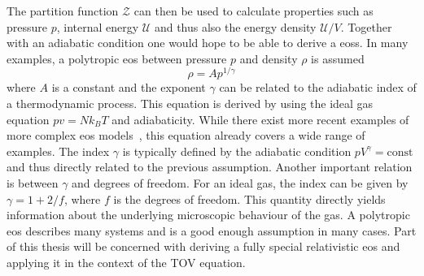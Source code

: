The partition function $\mathcal{Z}$ can then be used to calculate properties such as pressure $p$, internal energy $\mathcal{U}$ and thus also the energy density $\mathcal{U}/V$.
Together with an adiabatic condition one would hope to be able to derive a \acp{eos}.
In many examples, a polytropic \ac{eos} between pressure $p$ and density $\rho$ is assumed
\begin{equation}
	\rho = Ap^{1/\gamma}
	\label{eq:01-Intr-Poly-EOS}
\end{equation}
where $A$ is a constant and the exponent $\gamma$ can be related to the adiabatic index of a thermodynamic process.
This equation is derived by using the ideal gas equation $pv=Nk_B T$ and adiabaticity.
While there exist more recent examples of more complex \ac{eos} models~\cite{hummerEquationStateStellar1988}, this equation already covers a wide range of examples.
The index $\gamma$ is typically defined by the adiabatic condition $pV^\gamma=\text{const}$ and thus directly related to the previous assumption.
Another important relation is between $\gamma$ and degrees of freedom.
For an ideal gas, the index can be given by $\gamma=1+2/f$, where $f$ is the degrees of freedom.
This quantity directly yields information about the underlying microscopic behaviour of the gas.
A polytropic \ac{eos} describes many systems and is a good enough assumption in many cases.
Part of this thesis will be concerned with deriving a fully special relativistic \ac{eos} and applying it in the context of the \ac{TOV} equation.